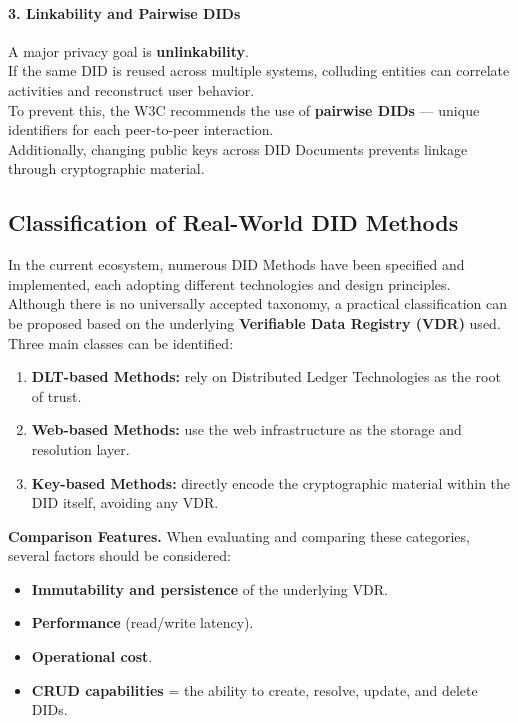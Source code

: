 \paragraph{3. Linkability and Pairwise DIDs}
A major privacy goal is \textbf{unlinkability}.\\  
If the same DID is reused across multiple systems, colluding entities can correlate activities and reconstruct user behavior.\\  
To prevent this, the W3C recommends the use of \textbf{pairwise DIDs} — unique identifiers for each peer-to-peer interaction.\\  
Additionally, changing public keys across DID Documents prevents linkage through cryptographic material.

\subsection{Classification of Real-World DID Methods}

In the current ecosystem, numerous DID Methods have been specified and implemented, each adopting different technologies and design principles.\\  
Although there is no universally accepted taxonomy, a practical classification can be proposed based on the underlying \textbf{Verifiable Data Registry (VDR)} used.\\
Three main classes can be identified:

\begin{enumerate}
    \item \textbf{DLT-based Methods:} rely on Distributed Ledger Technologies as the root of trust.
    \item \textbf{Web-based Methods:} use the web infrastructure as the storage and resolution layer.
    \item \textbf{Key-based Methods:} directly encode the cryptographic material within the DID itself, avoiding any VDR.
\end{enumerate}

\noindent
\textbf{Comparison Features.}  
When evaluating and comparing these categories, several factors should be considered:
\begin{itemize}
    \item \textbf{Immutability and persistence} of the underlying VDR.
    \item \textbf{Performance} (read/write latency).
    \item \textbf{Operational cost}.
    \item \textbf{CRUD capabilities} = the ability to create, resolve, update, and delete DIDs.
\end{itemize}

